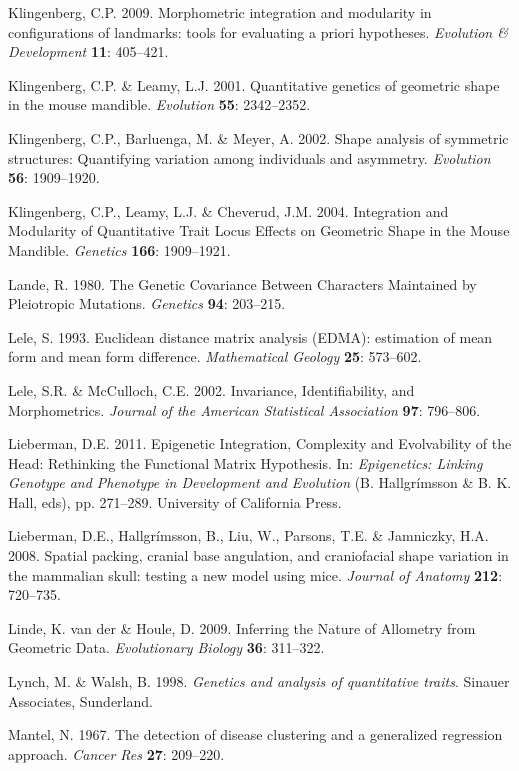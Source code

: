 \documentclass[11pt,twoside]{report}
\begin{document}
Klingenberg, C.P. 2009. Morphometric integration and modularity in
configurations of landmarks: tools for evaluating a priori hypotheses.
\emph{Evolution \& Development} \textbf{11}: 405--421.

Klingenberg, C.P. \& Leamy, L.J. 2001. Quantitative genetics of
geometric shape in the mouse mandible. \emph{Evolution} \textbf{55}:
2342--2352.

Klingenberg, C.P., Barluenga, M. \& Meyer, A. 2002. Shape analysis of
symmetric structures: Quantifying variation among individuals and
asymmetry. \emph{Evolution} \textbf{56}: 1909--1920.

Klingenberg, C.P., Leamy, L.J. \& Cheverud, J.M. 2004. Integration and
Modularity of Quantitative Trait Locus Effects on Geometric Shape in the
Mouse Mandible. \emph{Genetics} \textbf{166}: 1909--1921.

Lande, R. 1980. The Genetic Covariance Between Characters Maintained by
Pleiotropic Mutations. \emph{Genetics} \textbf{94}: 203--215.

Lele, S. 1993. Euclidean distance matrix analysis (EDMA): estimation of
mean form and mean form difference. \emph{Mathematical Geology}
\textbf{25}: 573--602.

Lele, S.R. \& McCulloch, C.E. 2002. Invariance, Identifiability, and
Morphometrics. \emph{Journal of the American Statistical Association}
\textbf{97}: 796--806.

Lieberman, D.E. 2011. Epigenetic Integration, Complexity and
Evolvability of the Head: Rethinking the Functional Matrix Hypothesis.
In: \emph{Epigenetics: Linking Genotype and Phenotype in Development and
Evolution} (B. Hallgrímsson \& B. K. Hall, eds), pp. 271--289.
University of California Press.

Lieberman, D.E., Hallgrímsson, B., Liu, W., Parsons, T.E. \& Jamniczky,
H.A. 2008. Spatial packing, cranial base angulation, and craniofacial
shape variation in the mammalian skull: testing a new model using mice.
\emph{Journal of Anatomy} \textbf{212}: 720--735.

Linde, K. van der \& Houle, D. 2009. Inferring the Nature of Allometry
from Geometric Data. \emph{Evolutionary Biology} \textbf{36}: 311--322.

Lynch, M. \& Walsh, B. 1998. \emph{Genetics and analysis of quantitative
traits}. Sinauer Associates, Sunderland.

Mantel, N. 1967. The detection of disease clustering and a generalized
regression approach. \emph{Cancer Res} \textbf{27}: 209--220.
\end{document}
